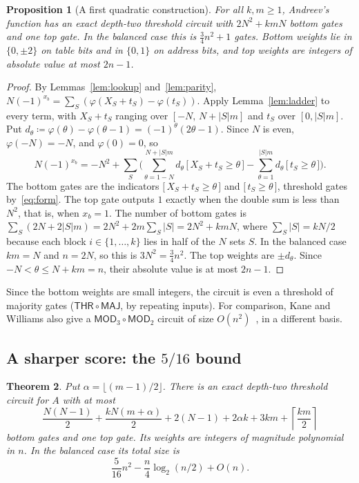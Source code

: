 \documentclass[11pt,letterpaper]{article}
\newtheorem{theorem}{Theorem}
\newtheorem{proposition}[theorem]{Proposition}
\theoremstyle{remark}
\newcommand{\ind}[1]{\bigl[\,#1\,\bigr]}
\newcommand{\subsect}[1]{\subsection*{\texorpdfstring{\color{ink}#1}{#1}}}
\newcommand{\THR}{\mathsf{THR}}
\begin{document}
\begin{proposition}[A first quadratic construction]\label{prop:basic}
For all $k,m\ge1$, Andreev's function has an exact depth-two threshold
circuit with $2N^2+kmN$ bottom gates and one top gate. In the balanced case
this is $\tfrac34n^2+1$ gates. Bottom weights lie in $\{0,\pm2\}$ on table
bits and in $\{0,1\}$ on address bits, and
top weights are integers of absolute value at most $2n-1$.
\end{proposition}
\begin{proof}
By Lemmas~\ref{lem:lookup} and~\ref{lem:parity},
$N(-1)^{x_b}=\sum_S\left(\varphi(X_S+t_S)-\varphi(t_S)\right)$.
Apply Lemma~\ref{lem:ladder} to every term, with $X_S+t_S$ ranging over
$[-N,\,N+|S|m]$ and $t_S$ over $[0,|S|m]$. Put
$d_\theta\coloneqq\varphi(\theta)-\varphi(\theta-1)=(-1)^\theta(2\theta-1)$.
Since $N$ is even, $\varphi(-N)=-N$, and $\varphi(0)=0$, so
\[
N(-1)^{x_b}=-N^2+\sum_S\Biggl(\sum_{\theta=1-N}^{N+|S|m}d_\theta\,\ind{X_S+t_S\ge\theta}
-\sum_{\theta=1}^{|S|m}d_\theta\,\ind{t_S\ge\theta}\Biggr).
\]
The bottom gates are the indicators $\ind{X_S+t_S\ge\theta}$ and
$\ind{t_S\ge\theta}$, threshold gates by~\eqref{eq:form}. The top gate
outputs $1$ exactly when the double sum is less than $N^2$, that is, when
$x_b=1$. The number of bottom gates is $\sum_S(2N+2|S|m)=
2N^2+2m\sum_S|S|=2N^2+kmN$, where $\sum_S|S|=kN/2$ because
each block $i\in\{1,\dots,k\}$ lies in half of the $N$ sets $S$.
In the balanced case $km=N$ and $n=2N$, so this is $3N^2=\tfrac34n^2$.
The top weights are $\pm d_\theta$. Since $-N<\theta\le N+km=n$, their
absolute value is at most $2n-1$.
\end{proof}
Since the bottom weights are small integers, the circuit is even a threshold
of majority gates ($\THR\circ\mathsf{MAJ}$, by repeating inputs). For
comparison, Kane and Williams also give a $\mathsf{MOD}_3\circ\mathsf{MOD}_2$
circuit of size $O(n^2)$~\cite[Thm.~1.2]{KW}, in a different basis.

\subsect{A sharper score: the \texorpdfstring{$5/16$}{5/16} bound}

\begin{theorem}\label{thm:exact}
Put $\alpha=\lfloor(m-1)/2\rfloor$. There is an exact depth-two threshold
circuit for $A$ with at most
\begin{equation}\label{eq:bestcount}
\frac{N(N-1)}2+\frac{kN(m+\alpha)}2
 +2(N-1)+2\alpha k+3km+\left\lceil\frac{km}{2}\right\rceil
\end{equation}
bottom gates and one top gate. Its weights are integers of magnitude
polynomial in $n$. In the balanced case its total size is
\[
\frac5{16}n^2-\frac n4\log_2(n/2)+O(n).
\]
\end{theorem}
\end{document}
